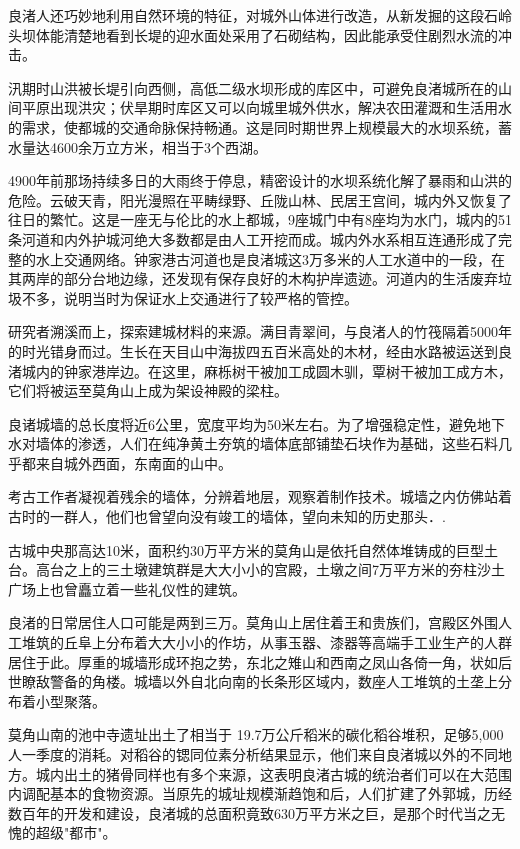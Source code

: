 良渚人还巧妙地利用自然环境的特征，对城外山体进行改造，从新发掘的这段石岭头坝体能清楚地看到长堤的迎水面处采用了石砌结构，因此能承受住剧烈水流的冲击。

汛期时山洪被长堤引向西侧，高低二级水坝形成的库区中，可避免良渚城所在的山间平原出现洪灾；伏旱期时库区又可以向城里城外供水，解决农田灌溉和生活用水的需求，使都城的交通命脉保持畅通。这是同时期世界上规模最大的水坝系统，蓄水量达4600余万立方米，相当于3个西湖。

4900年前那场持续多日的大雨终于停息，精密设计的水坝系统化解了暴雨和山洪的危险。云破天青，阳光漫照在平畴绿野、丘陇山林、民居王宫间，城内外又恢复了往日的繁忙。这是一座无与伦比的水上都城，9座城门中有8座均为水门，城内的51条河道和内外护城河绝大多数都是由人工开挖而成。城内外水系相互连通形成了完整的水上交通网络。钟家港古河道也是良渚城这3万多米的人工水道中的一段，在其两岸的部分台地边缘，还发现有保存良好的木构护岸遗迹。河道内的生活废弃垃圾不多，说明当时为保证水上交通进行了较严格的管控。

研究者溯溪而上，探索建城材料的来源。满目青翠间，与良渚人的竹筏隔着5000年的时光错身而过。生长在天目山中海拔四五百米高处的木材，经由水路被运送到良渚城内的钟家港岸边。在这里，麻栎树干被加工成圆木驯，覃树干被加工成方木，它们将被运至莫角山上成为架设神殿的梁柱。

良诸城墙的总长度将近6公里，宽度平均为50米左右。为了增强稳定性，避免地下水对墙体的渗透，人们在纯净黄土夯筑的墙体底部铺垫石块作为基础，这些石料几乎都来自城外西面，东南面的山中。

考古工作者凝视着残余的墙体，分辨着地层，观察着制作技术。城墙之内仿佛站着古时的一群人，他们也曾望向没有竣工的墙体，望向未知的历史那头．.

古城中央那高达10米，面积约30万平方米的莫角山是依托自然体堆铸成的巨型土台。高台之上的三土墩建筑群是大大小小的宫殿，土墩之间7万平方米的夯柱沙土广场上也曾矗立着一些礼仪性的建筑。

良渚的日常居住人口可能是两到三万。莫角山上居住着王和贵族们，宫殿区外围人工堆筑的丘阜上分布着大大小小的作坊，从事玉器、漆器等高端手工业生产的人群居住于此。厚重的城墙形成环抱之势，东北之雉山和西南之凤山各倚一角，状如后世瞭敌警备的角楼。城墙以外自北向南的长条形区域内，数座人工堆筑的土垄上分布着小型聚落。

莫角山南的池中寺遗址出土了相当于 19.7万公斤稻米的碳化稻谷堆积，足够5,000人一季度的消耗。对稻谷的锶同位素分析结果显示，他们来自良渚城以外的不同地方。城内出土的猪骨同样也有多个来源，这表明良渚古城的统治者们可以在大范围内调配基本的食物资源。当原先的城址规模渐趋饱和后，人们扩建了外郭城，历经数百年的开发和建设，良渚城的总面积竟致630万平方米之巨，是那个时代当之无愧的超级"都市"。

